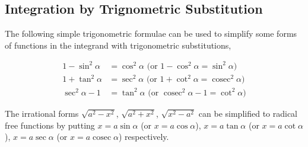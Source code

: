 \documentclass{book}
\DeclareMathOperator{\cosec}{cosec}
\theoremstyle{definition}
\begin{document}
\subsection{Integration by Trignometric Substitution}

The following simple trigonometric formulae can be used to simplify some forms of functions in the integrand with trigonometric substitutions, 

\begin{align*}
    1-\sin^2\alpha &= \cos^2\alpha \text{ (or } 1-\cos^2\alpha =\sin^2\alpha) \\
    1+\tan^2\alpha &= \sec^2\alpha \text{ (or } 1+\cot^2\alpha=\cosec^2\alpha) \\ 
    \sec^2\alpha-1 &= \tan^2\alpha \text{ (or } \cosec^2\alpha-1=\cot^2\alpha)
\end{align*}

The irrational forms $\sqrt{a^2-x^2}$, $\sqrt{a^2+x^2}$, $\sqrt{x^2-a^2}$ can be simplified to radical free functions by putting $x=a\sin\alpha$ (or $x=a\cos\alpha$), $x=a\tan\alpha$ (or $x=a\cot\alpha$), $x=a\sec\alpha$ (or $x=a\cosec\alpha$) respectively.
\end{document}
